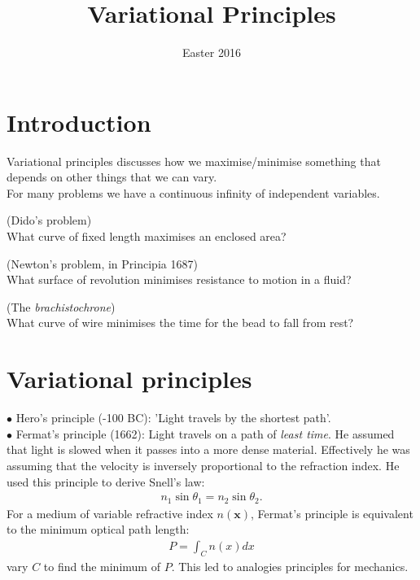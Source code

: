 \documentclass[a4paper]{article}
\begin{document}
\title{Variational Principles}
\date{Easter 2016}

\maketitle

\newpage

\tableofcontents

\newpage

\section{Introduction}
Variational principles discusses how we maximise/minimise something that depends on other things that we can vary.\\
For many problems we have a continuous infinity of independent variables.

\begin{eg} (Dido's problem)\\
What curve of fixed length maximises an enclosed area?
\end{eg}

\begin{eg} (Newton's problem, in Principia 1687)\\
What surface of revolution minimises resistance to motion in a fluid?
\end{eg}

\begin{eg} (The \emph{brachistochrone})\\
What curve of wire minimises the time for the bead to fall from rest?
\end{eg}

\newpage

\section{Variational principles}
$\bullet$ Hero's principle (-100 BC): 'Light travels by the shortest path'.\\
$\bullet$ Fermat's principle (1662): Light travels on a path of \emph{least time}. He assumed that light is slowed when it passes into a more dense material. Effectively he was assuming that the velocity is inversely proportional to the refraction index. He used this principle to derive Snell's law:
\begin{equation*}
\begin{aligned}
n_1 \sin \theta_1 = n_2 \sin \theta_2.
\end{aligned}
\end{equation*}
For a medium of variable refractive index $n\left(\mathbf{x}\right)$, Fermat's principle is equivalent to the minimum optical path length:
\begin{equation*}
\begin{aligned}
P=\int_C n\left(x\right) dx
\end{aligned}
\end{equation*}
vary $C$ to find the minimum of $P$. This led to analogies principles for mechanics.\\
\end{document}
